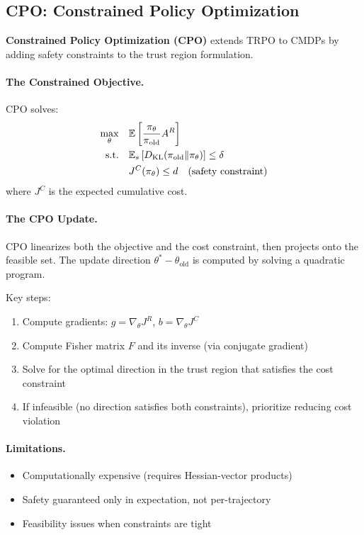 \subsection{CPO: Constrained Policy Optimization}

\textbf{Constrained Policy Optimization (CPO)} \citep{achiam2017constrained} extends TRPO to CMDPs by adding safety constraints to the trust region formulation.

\paragraph{The Constrained Objective.}
CPO solves:
\begin{align}
\max_\theta \quad & \mathbb{E} \left[ \frac{\pi_\theta}{\pi_{\text{old}}} A^R \right] \\
\text{s.t.} \quad & \mathbb{E}_s \left[ D_{\text{KL}}(\pi_{\text{old}} \| \pi_\theta) \right] \le \delta \\
& J^C(\pi_\theta) \le d \quad \text{(safety constraint)}
\end{align}
where $J^C$ is the expected cumulative cost.

\paragraph{The CPO Update.}
CPO linearizes both the objective and the cost constraint, then projects onto the feasible set. The update direction $\theta^* - \theta_{\text{old}}$ is computed by solving a quadratic program.

Key steps:
\begin{enumerate}
    \item Compute gradients: $g = \nabla_\theta J^R$, $b = \nabla_\theta J^C$
    \item Compute Fisher matrix $F$ and its inverse (via conjugate gradient)
    \item Solve for the optimal direction in the trust region that satisfies the cost constraint
    \item If infeasible (no direction satisfies both constraints), prioritize reducing cost violation
\end{enumerate}

\paragraph{Limitations.}
\begin{itemize}
    \item Computationally expensive (requires Hessian-vector products)
    \item Safety guaranteed only in expectation, not per-trajectory
    \item Feasibility issues when constraints are tight
\end{itemize}

